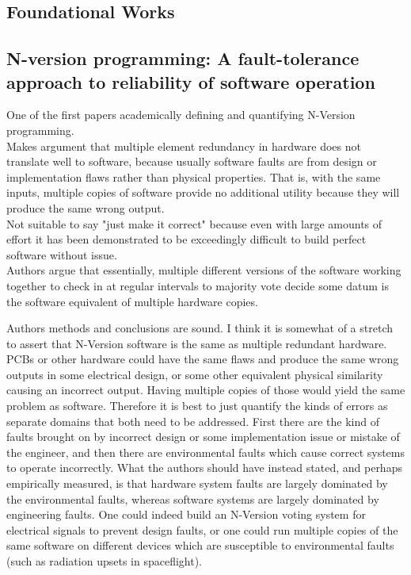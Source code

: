 \documentclass[article]{IEEEtran}
\begin{document}
\subsection{Foundational Works}


\subsection{N-version programming: A fault-tolerance approach to reliability of software operation}
One of the first papers academically defining and quantifying N-Version programming.
\\ 
Makes argument that multiple element redundancy in hardware does not translate well to software, because usually software faults are from design or implementation flaws rather than physical properties. That is, with the same inputs, multiple copies of software provide no additional utility because they will produce the same wrong output. 
\\ 
Not suitable to say "just make it correct" because even with large amounts of effort it has been demonstrated to be exceedingly difficult to build perfect software without issue. 
\\
Authors argue that essentially, multiple different versions of the software working together to check in at regular intervals to majority vote decide some datum is the software equivalent of multiple hardware copies.


Authors methods and conclusions are sound. I think it is somewhat of a stretch to assert that N-Version software is the same as multiple redundant hardware. PCBs or other hardware could have the same flaws and produce the same wrong outputs in some electrical design, or some other equivalent physical similarity causing an incorrect output. Having multiple copies of those would yield the same problem as software. Therefore it is best to just quantify the kinds of errors as separate domains that both need to be addressed. First there are the kind of faults brought on by incorrect design or some implementation issue or mistake of the engineer, and then there are environmental faults which cause correct systems to operate incorrectly. What the authors should have instead stated, and perhaps empirically measured, is that hardware system faults are largely dominated by the environmental faults, whereas software systems are largely dominated by engineering faults. One could indeed build an N-Version voting system for electrical signals to prevent design faults, or one could run multiple copies of the same software on different devices which are susceptible to environmental faults (such as radiation upsets in spaceflight).
\cite{chen1978n}
\end{document}
